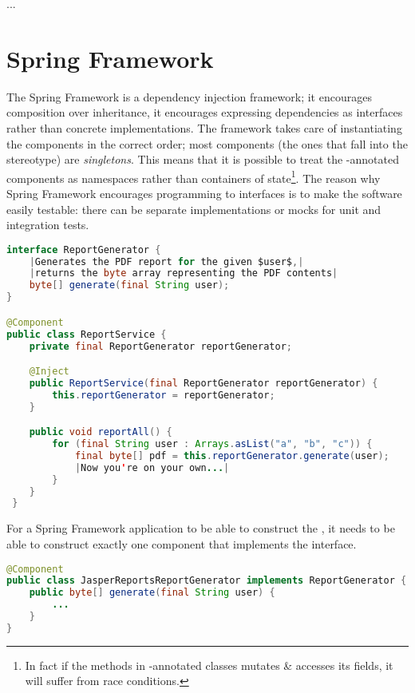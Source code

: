 \documentclass[10 pt]{article}
\begin{document}
...


\section{Spring Framework}
The Spring Framework is a dependency injection framework; it encourages composition over inheritance, it encourages expressing dependencies as interfaces rather than concrete implementations. The framework takes care of instantiating the components in the correct order; most components (the ones that fall into the  stereotype) are \emph{singletons}. This means that it is possible to treat the -annotated components as namespaces rather than containers of state\footnote{In fact if the methods in -annotated classes mutates \& accesses its fields, it will suffer from race conditions.}. The reason why Spring Framework encourages programming to interfaces is to make the software easily testable: there can be separate implementations or mocks for unit and integration tests.

\begin{lstlisting}[caption={Components}, label={code:sf1-java}, language=Java, escapechar=|]
interface ReportGenerator {
    |Generates the PDF report for the given $user$,|
    |returns the byte array representing the PDF contents|
    byte[] generate(final String user);
}

@Component
public class ReportService {
    private final ReportGenerator reportGenerator;

    @Inject
    public ReportService(final ReportGenerator reportGenerator) {
        this.reportGenerator = reportGenerator;
    }

    public void reportAll() {
        for (final String user : Arrays.asList("a", "b", "c")) {
            final byte[] pdf = this.reportGenerator.generate(user);
            |Now you're on your own...|
        }
    }
 }
\end{lstlisting}

For a Spring Framework application to be able to construct the , it needs to be able to construct exactly one component that implements the  interface.

\begin{lstlisting}[caption={Components}, label={code:sf2-java}, language=Java, escapechar=|]
@Component
public class JasperReportsReportGenerator implements ReportGenerator {
    public byte[] generate(final String user) {
        ...
    }
}
\end{lstlisting}
\end{document}
